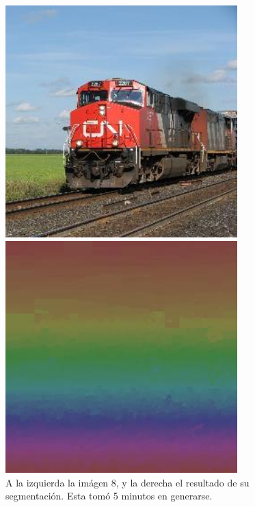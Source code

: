 \documentclass[letterpaper,11pt]{article} %
\begin{document}
      \begin{figure}[H]
        \centering
        \begin{minipage}{0.4\textwidth}
          \includegraphics[width=0.8\textwidth]{images/image_8}
        \end{minipage}
        \begin{minipage}{0.4\textwidth}
          \includegraphics[width=0.8\textwidth]{images/result_image8}
        \end{minipage}
        \caption{A la izquierda la imágen 8, y la derecha el resultado de su segmentación. Esta tomó 5 minutos en generarse.}
      \end{figure}
\end{document}
